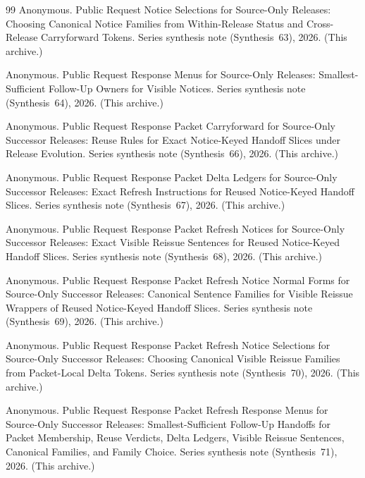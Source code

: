 \documentclass[11pt]{article}
\begin{document}
\begin{thebibliography}{99}
Anonymous.
\newblock Public Request Notice Selections for Source-Only Releases: Choosing Canonical Notice Families from Within-Release Status and Cross-Release Carryforward Tokens.
\newblock Series synthesis note (Synthesis~63), 2026. (This archive.)

Anonymous.
\newblock Public Request Response Menus for Source-Only Releases: Smallest-Sufficient Follow-Up Owners for Visible Notices.
\newblock Series synthesis note (Synthesis~64), 2026. (This archive.)

Anonymous.
\newblock Public Request Response Packet Carryforward for Source-Only Successor Releases: Reuse Rules for Exact Notice-Keyed Handoff Slices under Release Evolution.
\newblock Series synthesis note (Synthesis~66), 2026. (This archive.)

Anonymous.
\newblock Public Request Response Packet Delta Ledgers for Source-Only Successor Releases: Exact Refresh Instructions for Reused Notice-Keyed Handoff Slices.
\newblock Series synthesis note (Synthesis~67), 2026. (This archive.)

Anonymous.
\newblock Public Request Response Packet Refresh Notices for Source-Only Successor Releases: Exact Visible Reissue Sentences for Reused Notice-Keyed Handoff Slices.
\newblock Series synthesis note (Synthesis~68), 2026. (This archive.)

Anonymous.
\newblock Public Request Response Packet Refresh Notice Normal Forms for Source-Only Successor Releases: Canonical Sentence Families for Visible Reissue Wrappers of Reused Notice-Keyed Handoff Slices.
\newblock Series synthesis note (Synthesis~69), 2026. (This archive.)

Anonymous.
\newblock Public Request Response Packet Refresh Notice Selections for Source-Only Successor Releases: Choosing Canonical Visible Reissue Families from Packet-Local Delta Tokens.
\newblock Series synthesis note (Synthesis~70), 2026. (This archive.)

Anonymous.
\newblock Public Request Response Packet Refresh Response Menus for Source-Only Successor Releases: Smallest-Sufficient Follow-Up Handoffs for Packet Membership, Reuse Verdicts, Delta Ledgers, Visible Reissue Sentences, Canonical Families, and Family Choice.
\newblock Series synthesis note (Synthesis~71), 2026. (This archive.)


\end{thebibliography}
\end{document}
